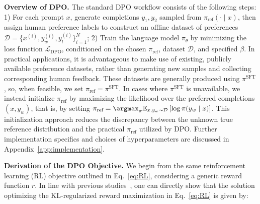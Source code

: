\textbf{Overview of DPO.} The standard DPO workflow consists of the following steps: 1) For each prompt $x$, generate completions $y_1, y_2$ sampled from $\pi_\text{ref}(\cdot \mid x)$, then assign human preference labels to construct an offline dataset of preferences $\mathcal{D} = \{x^{(i)}, y_w^{(i)}, y_l^{(i)}\}_{i=1}^N$; 2) Train the language model $\pi_\theta$ by minimizing the loss function $\mathcal{L}_\text{DPO}$, conditioned on the chosen $\pi_\text{ref}$, dataset $\mathcal{D}$, and specified $\beta$. In practical applications, it is advantageous to make use of existing, publicly available preference datasets, rather than generating new samples and collecting corresponding human feedback. These datasets are generally produced using $\pi^\text{SFT}$, so, when feasible, we set $\pi_\text{ref} = \pi^\text{SFT}$. In cases where $\pi^\text{SFT}$ is unavailable, we instead initialize $\pi_\text{ref}$ by maximizing the likelihood over the preferred completions ${(x, y_w)}$, that is, by setting ${\pi_\text{ref} = \argmax_{\pi}\mathbb{E}_{x, y_w \sim \mathcal{D}}\left[\log \pi(y_w \mid x)\right]}$. This initialization approach reduces the discrepancy between the unknown true reference distribution and the practical $\pi_\text{ref}$ utilized by DPO. Further implementation specifics and choices of hyperparameters are discussed in Appendix~\ref{app:implementation}.

\textbf{Derivation of the DPO Objective.} We begin from the same reinforcement learning (RL) objective outlined in Eq.~\ref{eq:RL}, considering a generic reward function $r$. In line with previous studies~\citep{peters2007reinforcement, peng2019advantage, korbak2022reinforcement, go2023aligning}, one can directly show that the solution optimizing the KL-regularized reward maximization in Eq.~\ref{eq:RL} is given by:


